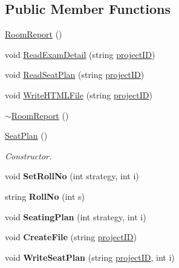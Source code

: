 \subsection*{\-Public \-Member \-Functions}
\begin{DoxyCompactItemize}
\item 
\hyperlink{classSeatPlan_a974a336df39c9fefc2b239a382a4749c}{\-Room\-Report} ()
\item 
void \hyperlink{classSeatPlan_ae93cefd4fd0401c5d54b8e97b23541ae}{\-Read\-Exam\-Detail} (string \hyperlink{classReadInput_a3ad470a25b3e0a29466bf4ff1f7d8e81}{project\-I\-D})
\item 
void \hyperlink{classSeatPlan_a618d148beefee9d4db3d038328c9b2c8}{\-Read\-Seat\-Plan} (string \hyperlink{classReadInput_a3ad470a25b3e0a29466bf4ff1f7d8e81}{project\-I\-D})
\item 
void \hyperlink{classSeatPlan_af572f79142f4dad362f54892c6747214}{\-Write\-H\-T\-M\-L\-File} (string \hyperlink{classReadInput_a3ad470a25b3e0a29466bf4ff1f7d8e81}{project\-I\-D})
\item 
\hyperlink{classSeatPlan_a446949506a25bcda5eb972c8a4b1384d}{$\sim$\-Room\-Report} ()
\item 
\hyperlink{classSeatPlan_ab1906186f96847704ed71f1a6c738327}{\-Seat\-Plan} ()
\begin{DoxyCompactList}\small\item\em \-Constructor. \end{DoxyCompactList}\item 
\hypertarget{classSeatPlan_afa418b9edadff831c73ea6005666becf}{void {\bfseries \-Set\-Roll\-No} (int strategy, int i)}\label{classSeatPlan_afa418b9edadff831c73ea6005666becf}

\item 
\hypertarget{classSeatPlan_a3dfc44c97eab7f3d33f2023ae0faaa13}{string {\bfseries \-Roll\-No} (int s)}\label{classSeatPlan_a3dfc44c97eab7f3d33f2023ae0faaa13}

\item 
\hypertarget{classSeatPlan_a1df3b03c983936c07225ed1a79959f1b}{void {\bfseries \-Seating\-Plan} (int strategy, int i)}\label{classSeatPlan_a1df3b03c983936c07225ed1a79959f1b}

\item 
\hypertarget{classSeatPlan_ade684c0f63b648d4d62df8e7ed800682}{void {\bfseries \-Create\-File} (string \hyperlink{classReadInput_a3ad470a25b3e0a29466bf4ff1f7d8e81}{project\-I\-D})}\label{classSeatPlan_ade684c0f63b648d4d62df8e7ed800682}

\item 
\hypertarget{classSeatPlan_a3f29cad9d9be46f7bc3055de2ab887fc}{void {\bfseries \-Write\-Seat\-Plan} (string \hyperlink{classReadInput_a3ad470a25b3e0a29466bf4ff1f7d8e81}{project\-I\-D}, int i)}\label{classSeatPlan_a3f29cad9d9be46f7bc3055de2ab887fc}


\end{DoxyCompactItemize}
